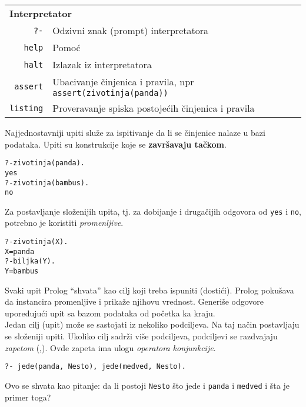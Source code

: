 \documentclass[../main.tex]{subfiles}
\begin{document}
\begin{boxprimer}
\begin{tabular}{rl}
\multicolumn{2}{l}{{\bf Interpretator}} \\
\texttt{?-} & Odzivni znak (prompt) interpretatora \\
\texttt{help} & Pomoć \\
\texttt{halt}& Izlazak iz interpretatora \\
\texttt{assert}&Ubacivanje činjenica i pravila, npr \texttt{assert(zivotinja(panda))}\\
\texttt{listing}&Proveravanje spiska postojećih činjenica i pravila
\end{tabular}

\end{boxprimer}

\begin{multicols}{2}
Najjednostavniji upiti služe za ispitivanje da li se činjenice nalaze u bazi podataka. Upiti su konstrukcije koje se {\bf završavaju tačkom}.
\columnbreak
\begin{boxprimer}
\begin{Verbatim}
?-zivotinja(panda).
yes
?-zivotinja(bambus).
no
\end{Verbatim}
\end{boxprimer}
\end{multicols}

\begin{multicols}{2}
Za postavljanje složenijih upita, tj. za dobijanje i drugačijih odgovora od \texttt{yes} i \texttt{no}, potrebno je koristiti {\it promenljive}.
\columnbreak
\begin{boxprimer}
\begin{Verbatim}
?-zivotinja(X).
X=panda
?-biljka(Y).
Y=bambus
\end{Verbatim}
\end{boxprimer}
\end{multicols}

Svaki upit Prolog ``shvata'' kao cilj koji treba ispuniti (dostići). Prolog pokušava da instancira promenljive i prikaže njihovu vrednost. Generiše odgovore upoređujući upit sa bazom podataka od početka ka kraju.
\\
Jedan cilj (upit) može se sastojati iz nekoliko podciljeva. Na taj način postavljaju se složeniji upiti. Ukoliko cilj sadrži više podciljeva, podciljevi se razdvajaju {\it zapetom} (,). Ovde zapeta ima ulogu {\it operatora konjunkcije}.
\\
\begin{multicols}{2}
\begin{boxprimer}
\begin{Verbatim}
?- jede(panda, Nesto), jede(medved, Nesto).
\end{Verbatim}
\end{boxprimer}
\columnbreak
Ovo se shvata kao pitanje: da li postoji \texttt{Nesto} što jede i \texttt{panda} i \texttt{medved} i šta je primer toga?
\end{multicols}
\end{document}
